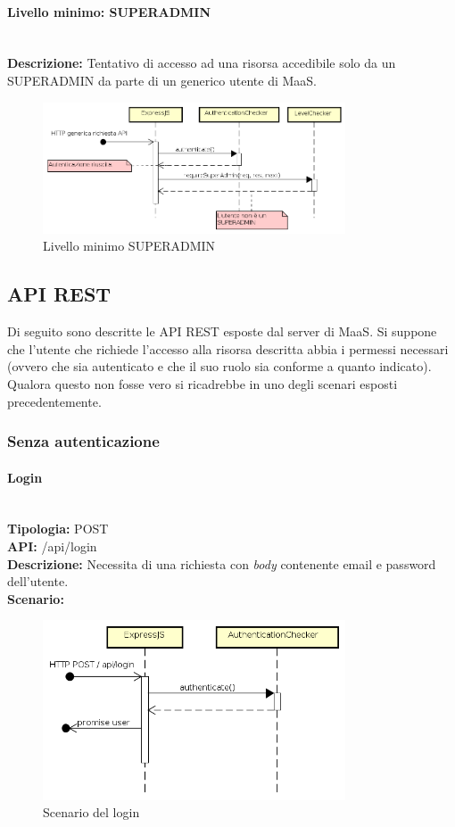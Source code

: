 \paragraph{Livello minimo: SUPERADMIN}  \mbox{} \\
\textbf{Descrizione:} Tentativo di accesso ad una risorsa accedibile solo da un SUPERADMIN da parte di un generico utente di MaaS.
\begin{figure}[H]
\centering
\includegraphics[width=0.8\textwidth]{res/sections/backend/sequence/requireSuperAdminFallita.png}
\caption{Livello minimo SUPERADMIN}
\end{figure}
\newpage
\subsection{API REST}
Di seguito sono descritte le API REST esposte dal server di MaaS. Si suppone che l'utente che richiede l'accesso alla risorsa descritta abbia i permessi necessari (ovvero che sia autenticato e che il suo ruolo sia conforme a quanto indicato). Qualora questo non fosse vero si ricadrebbe in uno degli scenari esposti precedentemente.
\subsubsection{Senza autenticazione}
\paragraph{Login}\mbox{}\\
\textbf{Tipologia:} POST \\
\textbf{API:} /api/login \\
\textbf{Descrizione:} Necessita di una richiesta con \textit{body} contenente email e password dell'utente. \\
\textbf{Scenario:} 
\begin{figure}[H]
\centering
\includegraphics[width=0.8\textwidth]{res/sections/backend/sequence/(POST)login.png}
\caption{Scenario del login}
\end{figure}

